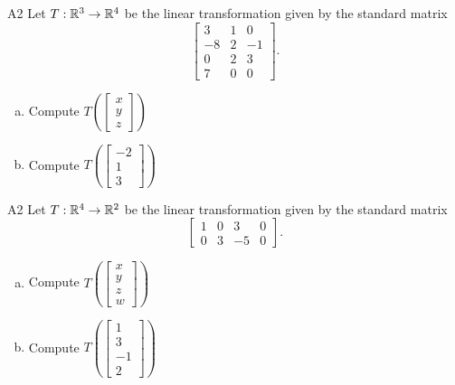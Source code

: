\begin{problem}{A2}
Let $T: \mathbb{R}^3\rightarrow \mathbb{R}^4$ be the linear transformation given by the standard matrix
$$\begin{bmatrix} 3 & 1 & 0 \\ -8 & 2 & -1 \\ 0 & 2 & 3 \\ 7 & 0 & 0 \end{bmatrix}.$$
\begin{enumerate}[(a)]
\item Compute \( T\left( \begin{bmatrix}x\\ y \\ z \end{bmatrix} \right) \)
\item Compute \( T\left( \begin{bmatrix}-2 \\ 1 \\ 3 \end{bmatrix} \right) \)
\end{enumerate}
\end{problem}

\begin{problem}{A2}
Let $T: \mathbb{R}^4 \rightarrow \mathbb{R}^2$ be the linear transformation given by the standard matrix
$$\begin{bmatrix} 1 & 0 & 3 & 0 \\ 0 & 3 & -5 & 0 \end{bmatrix}.$$
\begin{enumerate}[(a)]
\item Compute \( T\left( \begin{bmatrix}x\\ y \\ z \\ w \end{bmatrix} \right) \)
\item Compute \( T\left( \begin{bmatrix} 1 \\ 3 \\ -1 \\ 2\end{bmatrix} \right) \)
\end{enumerate}
\end{problem}

